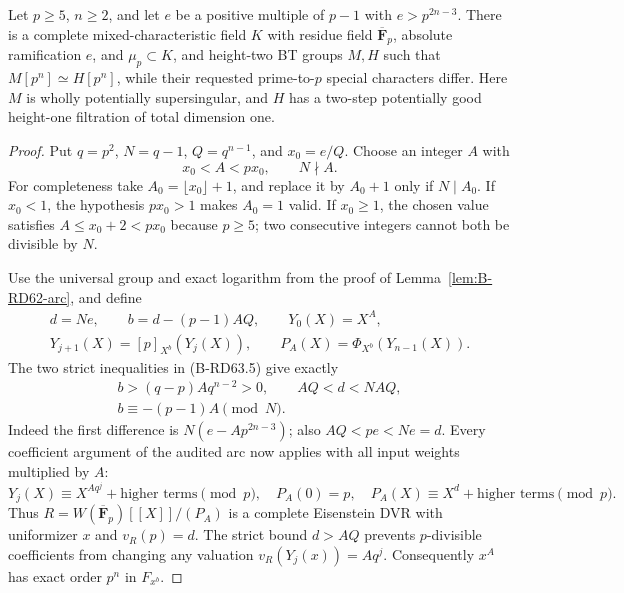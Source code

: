 \begin{theorem}
\label{thm:B-RD63-arc}
Let $p\ge5$, $n\ge2$, and let $e$ be a positive multiple of
$p-1$ with $e>p^{2n-3}$. There is a complete mixed-characteristic
field $K$ with residue field $\overline{\mathbf F}_p$, absolute
ramification $e$, and $\mu_p\subset K$, and height-two BT groups
$M,H$ such that $M[p^n]\simeq H[p^n]$, while their requested
prime-to-$p$ special characters differ. Here $M$ is wholly
potentially supersingular, and $H$ has a two-step potentially
good height-one filtration of total dimension one.
\end{theorem}
\begin{proof}
Put $q=p^2$, $N=q-1$, $Q=q^{n-1}$, and $x_0=e/Q$.
Choose an integer $A$ with
\[
                  x_0<A<px_0,\qquad N\nmid A.          \tag{B-RD63.5}
\]
For completeness take $A_0=\lfloor x_0\rfloor+1$, and replace it
by $A_0+1$ only if $N\mid A_0$. If $x_0<1$, the hypothesis
$px_0>1$ makes $A_0=1$ valid. If $x_0\ge1$, the chosen value
satisfies $A\le x_0+2<px_0$ because $p\ge5$; two consecutive
integers cannot both be divisible by $N$.

Use the universal group and exact logarithm from the proof of
Lemma~\ref{lem:B-RD62-arc}, and define
\[
 \begin{gathered}
 d=Ne,\qquad b=d-(p-1)AQ,\qquad Y_0(X)=X^A,\\
 Y_{j+1}(X)=[p]_{X^b}(Y_j(X)),\qquad
 P_A(X)=\Phi_{X^b}(Y_{n-1}(X)).
 \end{gathered}                                        \tag{B-RD63.6}
\]
The two strict inequalities in (B-RD63.5) give exactly
\[
 \begin{gathered}
 b>(q-p)Aq^{n-2}>0,\qquad AQ<d<NAQ,\\
 b\equiv-(p-1)A\pmod N.
 \end{gathered}                                        \tag{B-RD63.7}
\]
Indeed the first difference is $N(e-Ap^{2n-3})$; also
$AQ<pe<Ne=d$. Every coefficient argument of the audited arc
now applies with all input weights multiplied by $A$:
\[
 Y_j(X)\equiv X^{Aq^j}+\text{higher terms}\pmod p,
 \quad P_A(0)=p,
 \quad P_A(X)\equiv X^d+\text{higher terms}\pmod p.
\]
Thus $R=W(\overline{\mathbf F}_p)[[X]]/(P_A)$ is a complete
Eisenstein DVR with uniformizer $x$ and $v_R(p)=d$.
The strict bound $d>AQ$ prevents $p$-divisible coefficients from
changing any valuation $v_R(Y_j(x))=Aq^j$. Consequently $x^A$
has exact order $p^n$ in $F_{x^b}$.


\end{proof}
